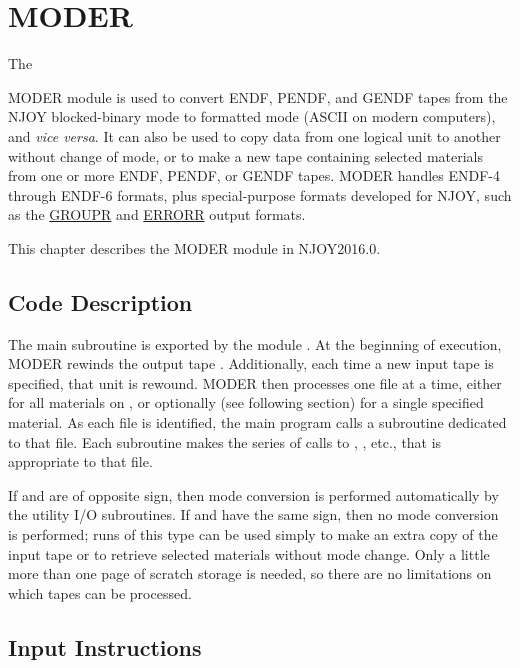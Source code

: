 \section{MODER}
\label{sMODER}

\hypertarget{sMODERhy}{The}
MODER module is used to convert ENDF,
PENDF, and GENDF tapes from the
NJOY blocked-binary mode to formatted mode
(ASCII on modern computers), and {\it vice versa}. It can
also be used to copy data from one logical unit to another without
change of mode, or to make a new tape containing selected materials
from one or more  ENDF, PENDF, or GENDF tapes.  MODER handles
ENDF-4 through ENDF-6 formats, plus special-purpose formats developed
for NJOY, such as the
\hyperlink{sGROUPRhy}{GROUPR} and
\hyperlink{sERRORRhy}{ERRORR}
output formats.

This chapter describes the MODER module in NJOY2016.0.

\subsection{Code Description}
\label{ssMODER_description}

The main subroutine  is exported by the
module .
At the beginning of execution, MODER rewinds the output tape .
Additionally, each time a new input tape  is specified,
that unit is rewound.  MODER then processes  one file at a time,
either for all materials on , or optionally (see following
section) for a single specified material. As each file is identified,
the main program calls a subroutine dedicated to that file.  Each
subroutine makes the series of calls to , ,
etc., that is appropriate to that file.

If  and  are of opposite sign, then mode conversion
is performed automatically by the utility I/O subroutines.  If
 and  have the same sign, then no mode conversion
is performed; runs of this type can be used simply to make an extra copy
of the input tape or to retrieve selected materials without mode change.
Only a little more than one page of scratch storage is needed, so there
are no limitations on which tapes can be processed.

\subsection{Input Instructions}
\label{ssMODER_inp}

